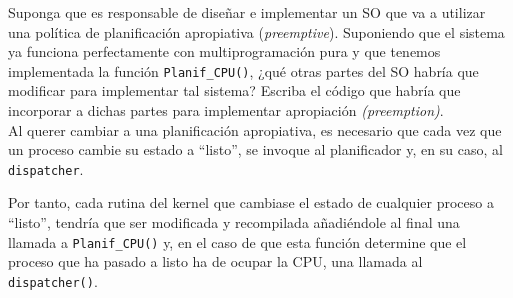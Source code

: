 \begin{ejercicio}
    Suponga que es responsable de diseñar e implementar un SO que va a utilizar una política de planificación apropiativa (\emph{preemptive}). Suponiendo que el sistema ya funciona perfectamente con multiprogramación pura y que tenemos implementada la función \verb|Planif_CPU()|, ¿qué otras partes del SO habría que modificar para implementar tal sistema? Escriba el código que habría que incorporar a dichas partes para implementar apropiación \emph{(preemption)}.\\

    Al querer cambiar a una planificación apropiativa, es necesario que cada vez que un proceso cambie su estado a ``listo'', se invoque al planificador y, en su caso, al \verb|dispatcher|.

    Por tanto, cada rutina del kernel que cambiase el estado de cualquier proceso a ``listo'', tendría que ser modificada y recompilada añadiéndole al final una llamada a \verb|Planif_CPU()| y, en el caso de que esta función determine que el proceso que ha pasado a listo ha de ocupar la CPU, una llamada al \verb|dispatcher()|.
\end{ejercicio}

